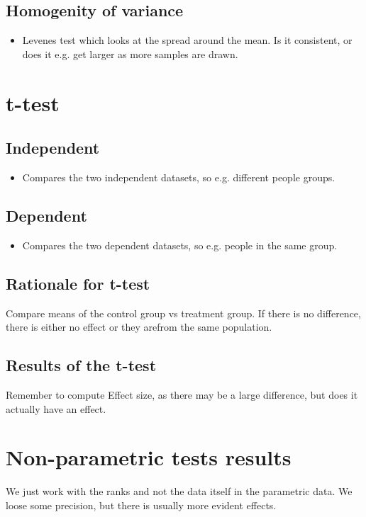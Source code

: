 \documentclass[a4paper]{article}
\begin{document}
\subsection{Homogenity of variance}
\begin{itemize}
	\item Levenes test which looks at the spread around the mean. Is it consistent, or does it e.g. get larger as more samples are drawn.
\end{itemize}

\section{t-test}
\subsection{Independent}
\begin{itemize}
	\item Compares the two independent datasets, so e.g. different people groups.
\end{itemize}
\subsection{Dependent}
\begin{itemize}
	\item Compares the two dependent datasets, so e.g. people in the same group.
\end{itemize}

\subsection{Rationale for t-test}
Compare means of the control group vs treatment group. If there is no difference, there is either no effect or they arefrom the same population.


\subsection{Results of the t-test}
Remember to compute Effect size, as there may be a large difference, but does it actually have an effect.


\section{Non-parametric tests results}
We just work with the ranks and not the data itself in the parametric data. We loose some precision, but there is usually more evident effects. 
\end{document}
